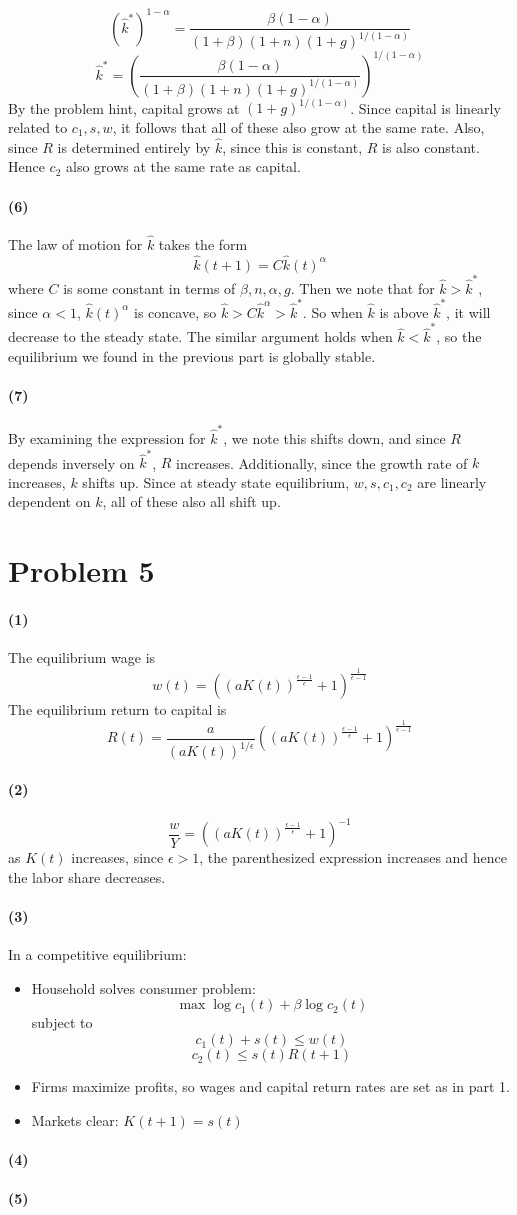 \documentclass[10pt,letter]{article}
\newcommand{\problem}[1]{\section*{Problem #1}}
\newcommand{\problempart}[1]{\paragraph{#1}}
\begin{document}
\[ (\hat{k}^*)^{1-\alpha}  = \frac{\beta (1-\alpha) }{(1+\beta)(1+n)(1+g)^{1/(1-\alpha)}} \]
\[\hat{k}^*   = \left(\frac{\beta (1-\alpha) }{(1+\beta)(1+n)(1+g)^{1/(1-\alpha)}} \right)^{1/(1-\alpha)} \]
By the problem hint, capital grows at $(1+g)^{1/(1-\alpha)}$. Since capital is linearly related to $c_1, s, w$, it follows that all of these also grow at the same rate. Also, since $R$ is determined entirely by $\hat{k}$, since this is constant, $R$ is also constant. Hence $c_2$ also grows at the same rate as capital.
\problempart{(6)}
The law of motion for $\hat{k}$ takes the form
\[ \hat{k}(t+1) = C\hat{k}(t)^\alpha \]
where $C$ is some constant in terms of $\beta, n, \alpha, g$. Then we note that for $\hat{k} > \hat{k}^*$, since $\alpha < 1$, $\hat{k}(t)^\alpha$ is concave, so $ \hat{k} > C\hat{k}^\alpha > \hat{k}^*$. So when $\hat{k}$ is above $\hat{k}^*$, it will decrease to the steady state. The similar argument holds when $\hat{k} < \hat{k}^*$, so the equilibrium we found in the previous part is globally stable.
\problempart{(7)}
By examining the expression for $\hat{k}^*$, we note this shifts down, and since $R$ depends inversely on $\hat{k}^*$, $R$ increases. Additionally, since the growth rate of $k$ increases, $k$ shifts up. Since at steady state equilibrium, $w, s, c_1, c_2$ are linearly dependent on $k$, all of these also all shift up.
\pagebreak
\problem{5}

\problempart{(1)}
The equilibrium wage is
\[ w(t) = \left( (aK(t))^{\frac{\epsilon-1}{\epsilon}} + 1 \right)^{\frac{1}{\epsilon - 1}} \]
The equilibrium return to capital is
\[ R(t) = \frac{a}{(aK(t))^{1/\epsilon}}\left( (aK(t))^{\frac{\epsilon-1}{\epsilon}} + 1 \right)^{\frac{1}{\epsilon - 1}} \]
\problempart{(2)}
\[ \frac{w}{Y} = \left( (aK(t))^{\frac{\epsilon-1}{\epsilon}} + 1 \right)^{-1} \]
as $K(t)$ increases, since $\epsilon > 1$, the parenthesized expression increases and hence the labor share decreases.
\problempart{(3)}
In a competitive equilibrium:
\begin{itemize}
  \item Household solves consumer problem:
  \[ \max \log c_1(t) + \beta \log c_2(t) \]
  subject to
  \[ c_1(t) + s(t) \le w(t) \]
  \[ c_2(t) \le s(t)R(t+1) \]
  \item Firms maximize profits, so wages and capital return rates are set as in part 1.
  \item Markets clear: $K(t+1) = s(t)$
\end{itemize}
\problempart{(4)}
\problempart{(5)}
\end{document}
